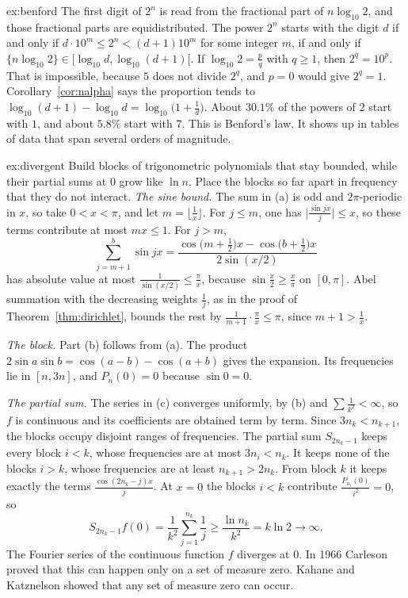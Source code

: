 \begin{solution}{ex:benford}
\idea The first digit of $2^n$ is read from the fractional part of $n\log_{10}2$, and those fractional parts are equidistributed.
\writeup The power $2^n$ starts with the digit $d$ if and only if $d\cdot10^m\le2^n<(d+1)10^m$ for some integer $m$, if and only if $\{n\log_{10}2\}\in[\log_{10}d,\log_{10}(d+1)[$. If $\log_{10}2=\frac pq$ with $q\ge1$, then $2^q=10^p$. That is impossible, because $5$ does not divide $2^q$, and $p=0$ would give $2^q=1$. Corollary~\ref{cor:nalpha} says the proportion tends to $\log_{10}(d+1)-\log_{10}d=\log_{10}\bigl(1+\frac1d\bigr)$. About $30.1\%$ of the powers of $2$ start with $1$, and about $5.8\%$ start with $7$. This is Benford's law. It shows up in tables of data that span several orders of magnitude.
\end{solution}

\begin{solution}{ex:divergent}
\idea Build blocks of trigonometric polynomials that stay bounded, while their partial sums at $0$ grow like $\ln n$. Place the blocks so far apart in frequency that they do not interact.
\writeup \emph{The sine bound.} The sum in (a) is odd and $2\pi$-periodic in $x$, so take $0<x<\pi$, and let $m=\lfloor\frac1x\rfloor$. For $j\le m$, one has $\bigl|\frac{\sin jx}j\bigr|\le x$, so these terms contribute at most $mx\le1$. For $j>m$,
\[
\sum_{j=m+1}^b\sin jx=\frac{\cos\bigl(m+\frac12\bigr)x-\cos\bigl(b+\frac12\bigr)x}{2\sin(x/2)}
\]
has absolute value at most $\frac1{\sin(x/2)}\le\frac\pi x$, because $\sin\frac x2\ge\frac x\pi$ on $[0,\pi]$. Abel summation with the decreasing weights $\frac1j$, as in the proof of Theorem~\ref{thm:dirichlet}, bounds the rest by $\frac1{m+1}\cdot\frac\pi x\le\pi$, since $m+1>\frac1x$.

\emph{The block.} Part (b) follows from (a). The product $2\sin a\sin b=\cos(a-b)-\cos(a+b)$ gives the expansion. Its frequencies lie in $[n,3n]$, and $P_n(0)=0$ because $\sin0=0$.

\emph{The partial sum.} The series in (c) converges uniformly, by (b) and $\sum\frac1{k^2}<\infty$, so $f$ is continuous and its coefficients are obtained term by term. Since $3n_k<n_{k+1}$, the blocks occupy disjoint ranges of frequencies. The partial sum $S_{2n_k-1}$ keeps every block $i<k$, whose frequencies are at most $3n_i<n_k$. It keeps none of the blocks $i>k$, whose frequencies are at least $n_{k+1}>2n_k$. From block $k$ it keeps exactly the terms $\frac{\cos(2n_k-j)x}j$. At $x=0$ the blocks $i<k$ contribute $\frac{P_{n_i}(0)}{i^2}=0$, so
\[
S_{2n_k-1}f(0)=\frac1{k^2}\sum_{j=1}^{n_k}\frac1j\ge\frac{\ln n_k}{k^2}=k\ln2\to\infty.
\]
The Fourier series of the continuous function $f$ diverges at $0$. In 1966 Carleson proved that this can happen only on a set of measure zero. Kahane and Katznelson showed that any set of measure zero can occur.
\end{solution}

